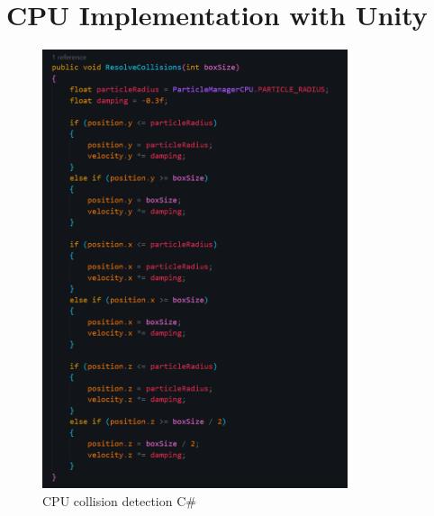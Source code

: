 \documentclass[12pt]{article}
\begin{document}
    \section{CPU Implementation with Unity}

    \begin{figure}[H]
        \centering
        \includegraphics[width=0.8\textwidth]{collisionDetectionCPU.png}
        \caption{CPU collision detection C\#}
    \end{figure}
\end{document}
